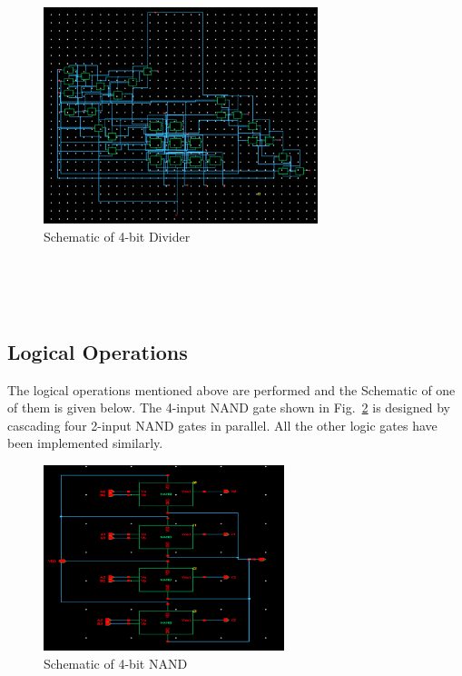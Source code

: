 \documentclass[conference]{IEEEtran}
\begin{document}
\begin{figure}[htbp]
\centerline{\includegraphics[width=8cm,keepaspectratio,]{"4bit_Divider.png"}}
\caption{Schematic of 4-bit  Divider}
\label{fig6}
\end{figure}
\\ \\ \\ 
\subsection{Logical Operations}\label{DB}
The logical operations mentioned above are performed and the Schematic of one of them is given below. The 4-input NAND gate shown in Fig.~\ref{fig7} is designed by cascading four 2-input NAND gates in parallel. All the other logic gates have been implemented similarly.
\begin{figure}[htbp]
\centerline{\includegraphics[width=7cm,keepaspectratio,]{"4bit_NAND.png"}}
\caption{Schematic of 4-bit NAND}
\label{fig7}
\end{figure}
\\ 
\end{document}
